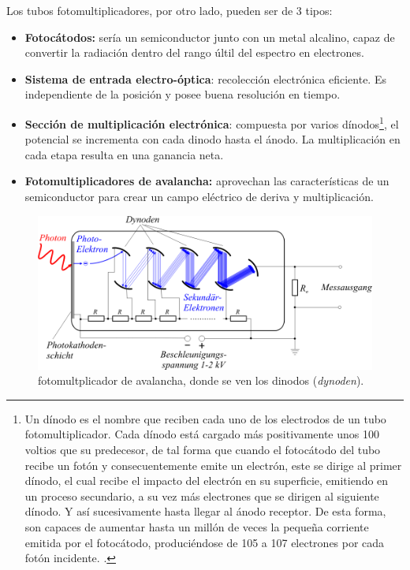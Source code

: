 Los tubos fotomultiplicadores, por otro lado, pueden ser de 3 tipos: 

\begin{itemize}
    \item \textbf{Fotocátodos:} sería un semiconductor junto con un metal alcalino, capaz de convertir la radiación dentro del rango últil del espectro en electrones.
    \item \textbf{Sistema de entrada electro-óptica}: recolección electrónica eficiente. Es independiente de la posición y posee buena resolución en tiempo. 
    \item \textbf{Sección de multiplicación electrónica}: compuesta por varios  dínodos\footnote{Un dínodo es el nombre que reciben cada uno de los electrodos de un tubo fotomultiplicador. Cada dínodo está cargado más positivamente unos 100 voltios que su predecesor, de tal forma que cuando el fotocátodo del tubo recibe un fotón y consecuentemente emite un electrón, este se dirige al primer dínodo, el cual recibe el impacto del electrón en su superficie, emitiendo en un proceso secundario, a su vez más electrones que se dirigen al siguiente dínodo. Y así sucesivamente hasta llegar al ánodo receptor. De esta forma, son capaces de aumentar hasta un millón de veces la pequeña corriente emitida por el fotocátodo, produciéndose de 105 a 107 electrones por cada fotón incidente. \cite{wiki-dinodo}.}, el potencial se incrementa con cada dinodo hasta el ánodo. La multiplicación en cada etapa resulta en una ganancia neta.    
    \item \textbf{Fotomultiplicadores de avalancha:} aprovechan las características de un semiconductor para crear un campo eléctrico de deriva y multiplicación.
\end{itemize}

\begin{figure}[H] \centering
    \caption{fotomultplicador de avalancha, donde se ven los dinodos (\textit{dynoden}).}
    \includegraphics[width=0.7\linewidth]{Cuerpo/Ch_01/Detectores_Fotomultiplicador.png}
\end{figure}


